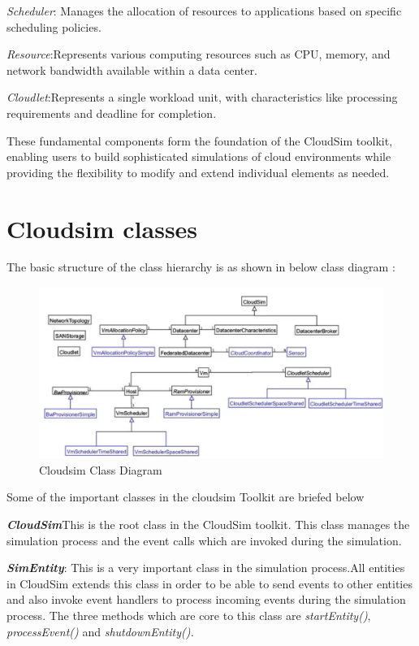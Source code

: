 \documentclass[a4paper,12pt]{Classes/RoboticsLaTeX}
\begin{document}
        \textit{Scheduler}: Manages the allocation of resources to applications based on specific scheduling policies.

        \textit{Resource}:Represents various computing resources such as CPU, memory, and network bandwidth available within a data center.
        
        \textit{Cloudlet}:Represents a single workload unit, with characteristics like processing requirements and deadline for completion.

        These fundamental components form the foundation of the CloudSim toolkit, enabling users to build sophisticated simulations of cloud environments while providing the flexibility to modify and extend individual elements as needed.

        \section{Cloudsim classes}

        The basic structure of the class hierarchy  is as shown in below class diagram  \cite{cloudsimtutorialsCloudSimSimulation}:

        \begin{figure}[H]
            \centering
            \includegraphics[width=1\linewidth]{Figures/Cloudsim_Class_Diagram.png}
            \caption{Cloudsim Class Diagram}
            \label{fig:Cloudsim class Diagram}
        \end{figure}
    
       Some of the important classes in the cloudsim Toolkit are briefed  below 

       \textit{\textbf{CloudSim}}This is the root class in the CloudSim toolkit. This class manages the simulation process and the event calls which are invoked during the simulation.

       \textit{\textbf{SimEntity}}: This is a very important class in the simulation process.All entities in CloudSim extends this class in order to be able to send events to other entities and also invoke event handlers to process incoming events during the simulation process. The three methods which are core to this class are \textit{startEntity()}, \textit{processEvent()} and \textit{shutdownEntity().}
\end{document}
